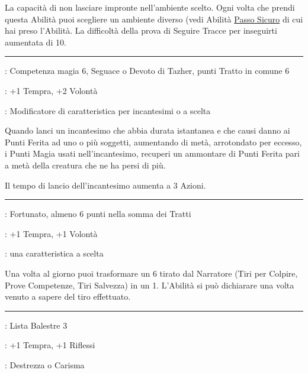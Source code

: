 \begin{multicols}{2}
La capacità di non lasciare impronte nell'ambiente scelto. Ogni volta che prendi questa Abilità puoi scegliere un ambiente diverso (vedi Abilità \hyperlink{passosicuro}{Passo Sicuro} di cui hai preso l'Abilità. La difficoltà della prova di Seguire Tracce per inseguirti aumentata di 10.

\smallskip\noindent\rule{\linewidth}{2pt} \hypertarget{Sifone Nero}{}\medskip{}
\noindent
\begin{description}[noitemsep, topsep=0pt, parsep=0pt, partopsep=0pt, leftmargin=0cm, labelwidth=2.5cm]
    \item[\textbf{Requisito}]: Competenza magia 6, Seguace o Devoto di Tazher, punti Tratto in comune 6
    \item[\textbf{Tiri Salvezza}]: +1 Tempra, +2 Volontà
    \item[\textbf{Caratteristica}]: Modificatore di caratteristica per incantesimi o a scelta
\end{description}

Quando lanci un incantesimo che abbia durata istantanea e che causi danno ai Punti Ferita ad uno o più soggetti, aumentando di metà, arrotondato per eccesso, i Punti Magia usati nell'incantesimo, recuperi un ammontare di Punti Ferita pari a metà della creatura che ne ha persi di più.

Il tempo di lancio dell'incantesimo aumenta a 3 Azioni.

\smallskip\noindent\rule{\linewidth}{2pt} \hypertarget{Sfortunato}{}\medskip{}
\noindent
\begin{description}[noitemsep, topsep=0pt, parsep=0pt, partopsep=0pt, leftmargin=0cm, labelwidth=2.5cm]
    \item[\textbf{Requisito}]: Fortunato, almeno 6 punti nella somma dei Tratti
    \item[\textbf{Tiri Salvezza}]: +1 Tempra, +1 Volontà
    \item[\textbf{Caratteristica}]: una caratteristica a scelta
\end{description}

Una volta al giorno puoi trasformare un 6 tirato dal Narratore (Tiri per Colpire, Prove Competenze, Tiri Salvezza) in un 1. L'Abilità si può dichiarare una volta venuto a sapere del tiro effettuato.

\smallskip\noindent\rule{\linewidth}{2pt} \hypertarget{Spara e Scappa}{}\medskip{}
\noindent
\begin{description}[noitemsep, topsep=0pt, parsep=0pt, partopsep=0pt, leftmargin=0cm, labelwidth=2.5cm]
    \item[\textbf{Requisito}]: Lista Balestre 3
    \item[\textbf{Tiri Salvezza}]: +1 Tempra, +1 Riflessi
    \item[\textbf{Caratteristica}]: Destrezza o Carisma
\end{description}


\end{multicols}
